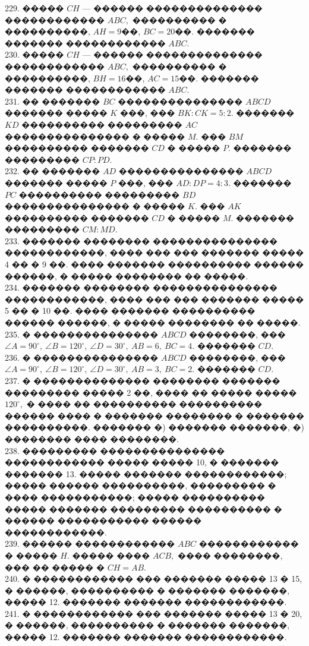 \documentclass[12pt]{article}
\begin{document}
229. ����� $CH$ --- ������ �������������� ������������ $ABC,$ ���������� � ����������, $AH=9$��, $BC=20$��. ������� ������� ������������ $ABC.$\\
230. ����� $CH$ --- ������ �������������� ������������ $ABC,$ ���������� � ����������, $BH=16$��, $AC=15$��. ������� ������� ������������ $ABC.$\\
231. �� ������� $BC$ ��������������� $ABCD$ ������� ����� $K$ ���, ��� $BK:CK=5:2.$ ������� $KD$ ���������� ��������� $AC$ ��������������� � ����� $M.$ ��� $BM$ ���������� ������� $CD$ � ����� $P.$ ������� ��������� $CP:PD.$\\
232. �� ������� $AD$ ��������������� $ABCD$ ������� ����� $P$ ���, ��� $AD:DP=4:3.$ ������� $PC$ ���������� ��������� $BD$ ��������������� � ����� $K.$ ��� $AK$ ���������� ������� $CD$ � ����� $M.$ ������� ��������� $CM:MD.$\\
233. ������� �������� ��������������� ������������, ���� ��� ��� ������� ����� 4 �� � 9 ��. ���� ������� ���������� ������ ������, � ����� �������� �� �����.\\
234. ������� �������� ��������������� ������������, ���� ��� ��� ������� ����� 5 �� � 10 ��. ���� ������� ���������� ������ ������, � ����� �������� �� �����.\\
235. � ��������������� $ABCD$ ��������, ��� $\angle A=90^\circ,\ \angle B=120^\circ,\ \angle D=30^\circ,\ AB=6,\ BC=4.$ ������� $CD.$\\
236. � ��������������� $ABCD$ ��������, ��� $\angle A=90^\circ,\ \angle B=120^\circ,\ \angle D=30^\circ,\ AB=3,\ BC=2.$ ������� $CD.$\\
237. � �������������� �������� ������� ��������� ����� 2 ��, ���� �� ����� ����� $120^\circ,$ � ���� �� ���������� ���������� ������ ���� � ������� �������� � ������� ����������. ������� �) ������� �������, �) �������� ���� ��������.\\
238. ��������� ��������������� ������������ ����� ����� 10, � ������� ������� 13. ����� ������� ������������; ����� ������ ����������, ��������� � ���� �����������; ����� ���������� ����� ������� ��������� ���������� � ������ ����������� ������ ������������.\\
239. ������ ������������ $ABC$ ������������ � ����� $H.$ ����� ���� $ACB,$ ���� ��������, ��� �� ����� � $CH=AB.$\\
240. � ������������ ��� ������� ����� 13 � 15, � ������, ���������� � ������� �������, ����� 12. ������� ������� ������������.\\
241. � ������������ ��� ������� ����� 13 � 20, � ������, ���������� � ������� �������, ����� 12. ������� ������� ������������.\\
\end{document}
